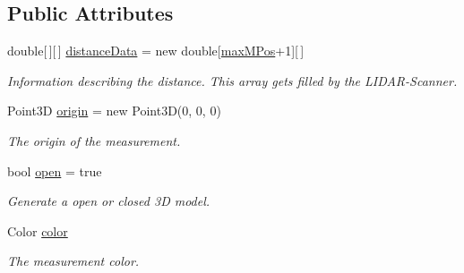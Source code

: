 \subsection*{Public Attributes}
\begin{DoxyCompactItemize}
\item 
double\mbox{[}$\,$\mbox{]}\mbox{[}$\,$\mbox{]} \hyperlink{class_l_i_d_a_r___controller_1_1_measurement_a5ed2a945e26682eabe612fdcbf6d6c54}{distance\+Data} = new double\mbox{[}\hyperlink{class_l_i_d_a_r___controller_1_1_measurement_ae4e112299a3c15095e6148bd06a47946}{max\+M\+Pos}+1\mbox{]}\mbox{[}$\,$\mbox{]}\hypertarget{class_l_i_d_a_r___controller_1_1_measurement_a5ed2a945e26682eabe612fdcbf6d6c54}{}\label{class_l_i_d_a_r___controller_1_1_measurement_a5ed2a945e26682eabe612fdcbf6d6c54}

\begin{DoxyCompactList}\small\item\em Information describing the distance. This array gets filled by the L\+I\+D\+A\+R-\/\+Scanner. \end{DoxyCompactList}\item 
Point3D \hyperlink{class_l_i_d_a_r___controller_1_1_measurement_ac0d4306c375f9863f2a1b8591192feca}{origin} = new Point3D(0, 0, 0)\hypertarget{class_l_i_d_a_r___controller_1_1_measurement_ac0d4306c375f9863f2a1b8591192feca}{}\label{class_l_i_d_a_r___controller_1_1_measurement_ac0d4306c375f9863f2a1b8591192feca}

\begin{DoxyCompactList}\small\item\em The origin of the measurement. \end{DoxyCompactList}\item 
bool \hyperlink{class_l_i_d_a_r___controller_1_1_measurement_ac9a586dd0d097caa2306aa810abd6fcf}{open} = true\hypertarget{class_l_i_d_a_r___controller_1_1_measurement_ac9a586dd0d097caa2306aa810abd6fcf}{}\label{class_l_i_d_a_r___controller_1_1_measurement_ac9a586dd0d097caa2306aa810abd6fcf}

\begin{DoxyCompactList}\small\item\em Generate a open or closed 3D model. \end{DoxyCompactList}\item 
Color \hyperlink{class_l_i_d_a_r___controller_1_1_measurement_ab3e8e546ef03cf350dc751f2e1e884b0}{color}\hypertarget{class_l_i_d_a_r___controller_1_1_measurement_ab3e8e546ef03cf350dc751f2e1e884b0}{}\label{class_l_i_d_a_r___controller_1_1_measurement_ab3e8e546ef03cf350dc751f2e1e884b0}

\begin{DoxyCompactList}\small\item\em The measurement color. \end{DoxyCompactList}\end{DoxyCompactItemize}
